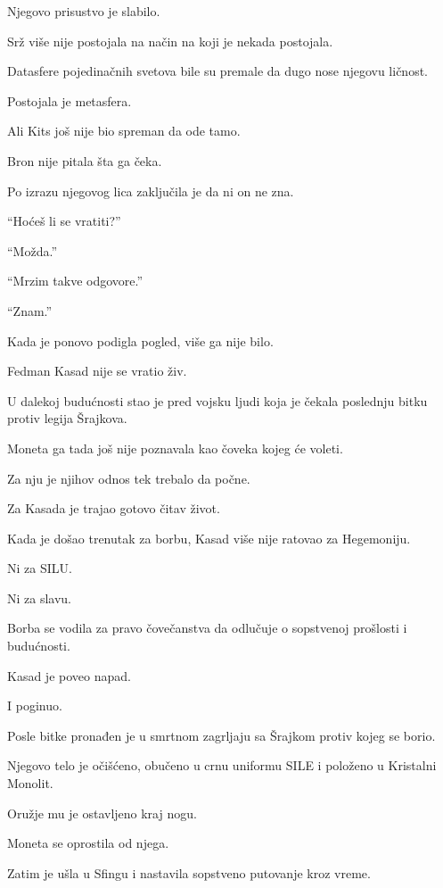 \bigskip

Njegovo prisustvo je slabilo.

Srž više nije postojala na način na koji je nekada postojala.

Datasfere pojedinačnih svetova bile su premale da dugo nose njegovu ličnost.

Postojala je metasfera.

Ali Kits još nije bio spreman da ode tamo.

Bron nije pitala šta ga čeka.

Po izrazu njegovog lica zaključila je da ni on ne zna.

``Hoćeš li se vratiti?''

``Možda.''

``Mrzim takve odgovore.''

``Znam.''

Kada je ponovo podigla pogled, više ga nije bilo.

\bigskip

Fedman Kasad nije se vratio živ.

U dalekoj budućnosti stao je pred vojsku ljudi koja je čekala poslednju bitku protiv legija Šrajkova.

Moneta ga tada još nije poznavala kao čoveka kojeg će voleti.

Za nju je njihov odnos tek trebalo da počne.

Za Kasada je trajao gotovo čitav život.

\bigskip

Kada je došao trenutak za borbu, Kasad više nije ratovao za Hegemoniju.

Ni za SILU.

Ni za slavu.

Borba se vodila za pravo čovečanstva da odlučuje o sopstvenoj prošlosti i budućnosti.

Kasad je poveo napad.

I poginuo.

\bigskip

Posle bitke pronađen je u smrtnom zagrljaju sa Šrajkom protiv kojeg se borio.

Njegovo telo je očišćeno, obučeno u crnu uniformu SILE i položeno u Kristalni Monolit.

Oružje mu je ostavljeno kraj nogu.

Moneta se oprostila od njega.

Zatim je ušla u Sfingu i nastavila sopstveno putovanje kroz vreme.

\bigskip

